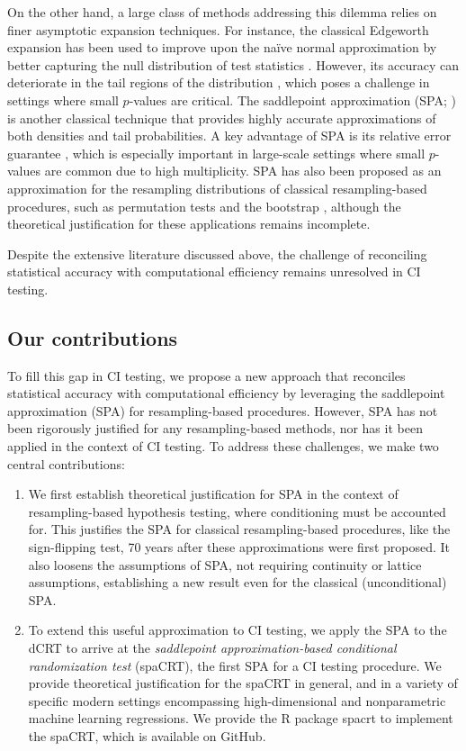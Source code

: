 \documentclass[12pt]{article}
\theoremstyle{definition}
\begin{document}
  On the other hand, a large class of methods addressing this dilemma relies on finer asymptotic expansion techniques. For instance, the classical Edgeworth expansion has been used to improve upon the naïve normal approximation by better capturing the null distribution of test statistics \citep{hall2013bootstrap,bentkus1997edgeworth,Bickel1974}. However, its accuracy can deteriorate in the tail regions of the distribution \citep{hall2013bootstrap}, which poses a challenge in settings where small $p$-values are critical. The saddlepoint approximation (SPA; \citealp{Daniels1954,Lugannani1980}) is another classical technique that provides highly accurate approximations of both densities and tail probabilities. A key advantage of SPA is its relative error guarantee \citep{Butler2007,Kolassa2006}, which is especially important in large-scale settings where small $p$-values are common due to high multiplicity. SPA has also been proposed as an approximation for the resampling distributions of classical resampling-based procedures, such as permutation tests \citep{Robinson1982} and the bootstrap \citep{Hinkley1988}, although the theoretical justification for these applications remains incomplete.
  
  Despite the extensive literature discussed above, the challenge of reconciling statistical accuracy with computational efficiency remains unresolved in CI testing.
  
  \subsection{Our contributions}
  
  To fill this gap in CI testing, we propose a new approach that reconciles statistical accuracy with computational efficiency by leveraging the saddlepoint approximation (SPA) for resampling-based procedures. However, SPA has not been rigorously justified for any resampling-based methods, nor has it been applied in the context of CI testing. To address these challenges, we make two central contributions:
  
  \begin{enumerate}
	\item We first establish theoretical justification for SPA in the context of resampling-based hypothesis testing, where conditioning must be accounted for. This justifies the SPA for classical resampling-based procedures, like the sign-flipping test, 70 years after these approximations were first proposed. It also loosens the assumptions of SPA, not requiring continuity or lattice assumptions, establishing a new result even for the classical (unconditional) SPA.
	\item To extend this useful approximation to CI testing, we apply the SPA to the dCRT to arrive at the \textit{saddlepoint approximation-based conditional randomization test} (spaCRT), the first SPA for a CI testing procedure. We provide theoretical justification for the spaCRT in general, and in a variety of specific modern settings encompassing high-dimensional and nonparametric machine learning regressions. We provide the R package spacrt to implement the spaCRT, which is available on GitHub.
  \end{enumerate}
  
\end{document}
